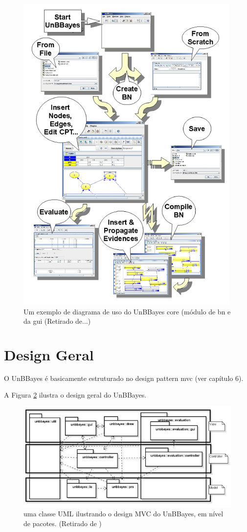 \begin{figure}[H]
	\centering
	\includegraphics{figuras/unbbayes_usage}
	\caption[Diagrama de uso do UnBBayes]{Um exemplo de diagrama de uso do UnBBayes core (módulo de \gls{bn} e da \gls{gui} (Retirado de...)}
	\label{fig:unbbayes_usage}
\end{figure}


\section{Design Geral}
O UnBBayes é basicamente estruturado no design pattern \gls{mvc}
(ver capítulo 6).

A Figura \ref{fig:unbbayes_mvc} ilustra o design geral do UnBBayes.
\begin{figure}[H]
	\centering
	\includegraphics[width = 440px]{figuras/unbbayes_mvc}
	\caption[UnBBayes UML MVC]{uma classe UML ilustrando o design MVC do UnBBayes, em nível de pacotes. (Retirado de \cite{javaApi11})}
	\label{fig:unbbayes_mvc}
\end{figure}

